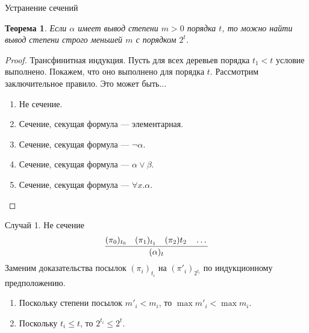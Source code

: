 \documentclass[aspectratio=169]{beamer}
\newtheorem{thm}{Теорема}[section]
\begin{document}
\begin{frame}{Устранение сечений}
\begin{thm}Если $\alpha$ имеет вывод степени $m>0$ порядка $t$, то
можно найти вывод степени строго меньшей $m$ с порядком $2^t$.
\end{thm}

\begin{proof}Трансфинитная индукция. Пусть для всех деревьев порядка $t_1 < t$ 
условие выполнено. Покажем, что оно выполнено для порядка $t$.
Рассмотрим заключительное правило. Это может быть...

\begin{enumerate}
\item Не сечение.
\item Сечение, секущая формула --- элементарная.
\item Сечение, секущая формула --- $\neg\alpha$.
\item Сечение, секущая формула --- $\alpha\vee\beta$.
\item Сечение, секущая формула --- $\forall x.\alpha$.
\end{enumerate}
\end{proof}
\end{frame}

\begin{frame}{Случай 1. Не сечение}
$$\infer{(\alpha)_{t}}{(\pi_0)_{t_0}\quad(\pi_1)_{t_1}\quad(\pi_2){t_2}\quad\dots}$$
Заменим доказательства посылок $(\pi_i)_{t_i}$ на $(\pi'_i)_{2^{t_i}}$ по индукционному предположению.

\begin{enumerate}
\item Поскольку степени посылок $m'_i < m_i$, то $\max m'_i < \max m_i$.
\item Поскольку $t_i \le t$, то $2^{t_i} \le 2^t$.
\end{enumerate}
\end{frame}
\end{document}
